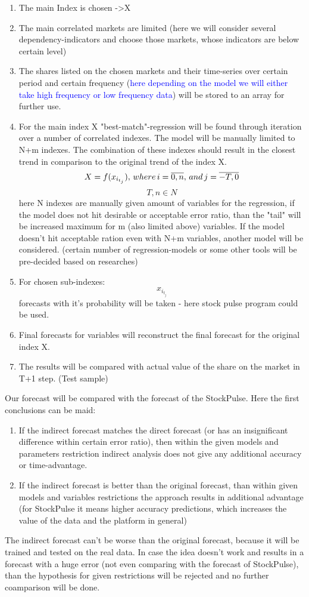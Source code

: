 \documentclass{article}
\begin{document}
\begin{enumerate}
	\item The main Index is chosen -\textgreater X
	\item The main correlated markets are limited (here we will consider several dependency-indicators and choose those markets, whose indicators are below certain level)
	\item The shares listed on the chosen markets and their time-series over certain period and certain frequency (\textcolor{blue}{here depending on the model we will either take high frequency or low frequency data}) will be stored to an array for further use.
	\item For the main index X "best-match"-regression will be found through iteration over a number of correlated indexes. The model will be manually limited to N+m indexes. The combination of these indexes should result in the closest trend in comparison to the original trend of the index X. \\
	\[X = f(x_{i_{t_{j}}}),\thinspace where \thinspace i=\overline{0,n},\thinspace and \thinspace j=\overline{-T,0} \]
	\[T, n \in N \]    
	here N indexes are manually given amount of variables for the regression, if the model does not hit desirable or acceptable error ratio, than the "tail" will be increased maximum for m (also limited above) variables. If the model doesn't hit acceptable ration even with N+m variables, another model will be considered. (certain number of regression-models or some other tools will be pre-decided based on researches)
	\item For chosen sub-indexes: \[x_{i_{t_{j}}}\] forecasts with it's probability will be taken - here stock pulse program could be used.
	\item Final forecasts for variables will reconstruct the final forecast for the original index X. 
	\item The results will be compared with actual value of the share on the market in T+1 step. (Test sample)
\end{enumerate}
Our forecast will be compared with the forecast of the StockPulse. Here the first conclusions can be maid:
	\begin{enumerate}
		\item If the indirect forecast matches the direct forecast (or has an insignificant difference within certain error ratio), then within the given models and parameters restriction indirect analysis does not give any additional accuracy or time-advantage. 
		\item If the indirect forecast is better than the original forecast, than within given models and variables restrictions the approach results in  additional advantage (for StockPulse it means higher accuracy predictions, which increases the value of the data and the platform in general)
	\end{enumerate}		
The indirect forecast can't be worse than the original forecast, because it will be trained and tested on the real data. In case the idea doesn't work and results in a forecast with a huge error (not even comparing with the forecast of StockPulse), than the hypothesis for given restrictions will be rejected and no further coamparison will be done.\\
\end{document}
